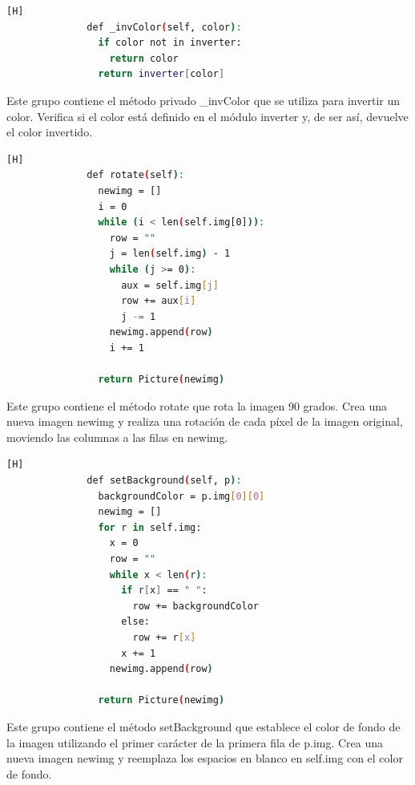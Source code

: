\documentclass{article}
\begin{document}
        \begin{lstlisting}[language=bash,caption={Método \_invColor}][H]
              def _invColor(self, color):
                if color not in inverter:
                  return color
                return inverter[color]
	\end{lstlisting}
Este grupo contiene el método privado \_invColor que se utiliza para invertir un color. Verifica si el color está definido en el módulo inverter y, de ser así, devuelve el color invertido.

        \begin{lstlisting}[language=bash,caption={Método rotate}][H]
              def rotate(self):
                newimg = []
                i = 0
                while (i < len(self.img[0])):
                  row = ""
                  j = len(self.img) - 1
                  while (j >= 0):
                    aux = self.img[j]
                    row += aux[i]
                    j -= 1
                  newimg.append(row)
                  i += 1
            
                return Picture(newimg)
	\end{lstlisting}
Este grupo contiene el método rotate que rota la imagen 90 grados. Crea una nueva imagen newimg y realiza una rotación de cada píxel de la imagen original, moviendo las columnas a las filas en newimg.

        \begin{lstlisting}[language=bash,caption={Método setBackground}][H]
              def setBackground(self, p):
                backgroundColor = p.img[0][0]
                newimg = []
                for r in self.img:
                  x = 0
                  row = ""
                  while x < len(r):
                    if r[x] == " ":
                      row += backgroundColor
                    else:
                      row += r[x]
                    x += 1
                  newimg.append(row)
            
                return Picture(newimg)
	\end{lstlisting}
Este grupo contiene el método setBackground que establece el color de fondo de la imagen utilizando el primer carácter de la primera fila de p.img. Crea una nueva imagen newimg y reemplaza los espacios en blanco en self.img con el color de fondo.
\end{document}
